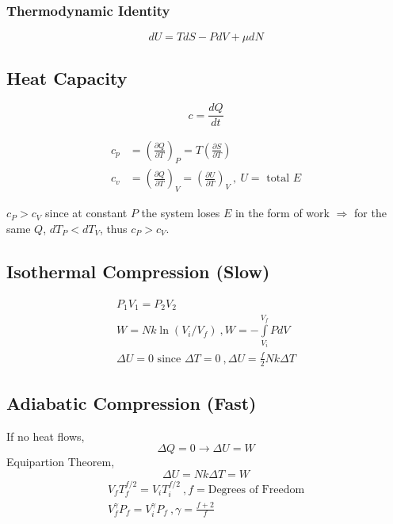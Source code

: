 \documentclass[10pt,letter]{article}
\begin{document}
\subsubsection{Thermodynamic Identity}
\begin{equation}
 dU = TdS - PdV + \mu dN 
\end{equation}

\subsection{Heat Capacity}
\begin{equation}
 c = \frac{dQ}{dt}
\end{equation}

\begin{align}
 c_p &= \left( \frac{\partial Q}{\partial T} \right)_P = T \left( \frac{\partial S}{\partial T} \right)\\
 c_v &= \left( \frac{\partial Q}{\partial T} \right)_V = \left( \frac{\partial U}{\partial T} \right)_V~,~U =\textrm{ total } E
\end{align}

$c_P > c_V$ since at constant $P$ the system loses $E$ in the form of work $\Rightarrow$ for the same $Q$, $dT_P < dT_V$, thus $c_P > c_V$.

\subsection{Isothermal Compression (Slow)}
\begin{align}
 P_1V_1 = P_2V_2\\
 W = Nk\ln(V_i/V_f) ~, W = -\int \limits_{V_i}^{V_f}PdV\\
 \Delta U =0 \textrm{ since } \Delta T = 0~, \Delta U = \frac{f}{2} Nk \Delta T
\end{align}

\subsection{Adiabatic Compression (Fast)}
If no heat flows,
\begin{equation}
    \Delta Q =0 \rightarrow \Delta U = W
\end{equation}
Equipartion Theorem, 
\begin{equation}
 \Delta U = Nk \Delta T = W 
\end{equation}
\begin{align}
 V_f T_f^{f/2}  = V_i T_i^{f/2}~, f = \textrm{Degrees of Freedom}\\
 V_f^\gamma P_f = V_i^\gamma P_f ~, \gamma = \frac{f + 2}{f}
\end{align}
\end{document}
